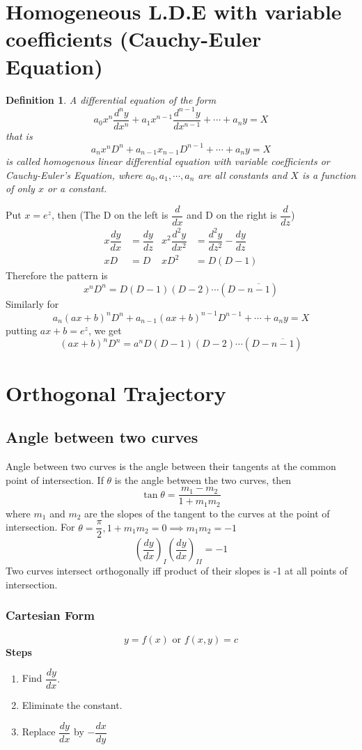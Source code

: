 \documentclass[a4paper, titlepage]{article}
\newtheorem{definition}{Definition}[section]
\begin{document}
\section{Homogeneous L.D.E with variable coefficients (Cauchy-Euler Equation) }
    \begin{definition}
        A differential equation of the form
        \[ a_0x^n\dfrac{d^ny}{dx^n} + a_1x^{n-1}\dfrac{d^{n-1}y}{dx^{n-1}} + \cdots + a_ny = X \]
        that is $$a_nx^nD^n + a_{n-1}x_{n-1}D^{n-1} + \cdots + a_ny = X$$ is called
        homogenous linear differential equation with variable coefficients
        or Cauchy-Euler's Equation, where $a_0, a_1, \cdots, a_n$ are all
        constants and $X$ is a function of only $x$ or a constant.
    \end{definition}
    Put $x = e^z$, then (The D on the left is $\dfrac{d}{dx}$ and D
    on the right is $\dfrac{d}{dz}$)
    \begin{align*}
        x\dfrac{dy}{dx} &= \dfrac{dy}{dz} &
        x^2\dfrac{d^2y}{dx^2} &= \dfrac{d^2y}{dz^2} - \dfrac{dy}{dz} \\
        xD &= D & xD^2 &= D(D-1)
    \end{align*}
    Therefore the pattern is $$x^nD^n = D(D-1)(D-2)\cdots(D-\overline{n-1})$$
    Similarly for $$a_n(ax+b)^nD^n + a_{n-1}(ax+b)^{n-1}D^{n-1} + \cdots + a_ny = X$$
    putting $ax + b = e^z$, we get $$(ax + b)^nD^n = a^nD(D-1)(D-2)\cdots(D-\overline{n-1}) $$

\section{Orthogonal Trajectory}
    \subsection{Angle between two curves}
        Angle between two curves is the angle between their tangents
        at the common point of intersection. If $\theta$ is the 
        angle between the two curves, then
        $$\tan\theta = \dfrac{m_1 - m_2}{1 + m_1m_2}$$ where $m_1$ and
        $m_2$ are the slopes of the tangent to the curves at the point of
        intersection. For $\theta = \dfrac{\pi}{2}, 1 + m_1m_2 = 0 
        \implies m_1m_2 = -1$ \[ \left(\dfrac{dy}{dx}\right)_I\left(
        \dfrac{dy}{dx}\right)_{II} = -1 \]
        Two curves intersect orthogonally iff product of their slopes
        is -1 at all points of intersection.
        \subsubsection{Cartesian Form}
        \[ y = f(x) \text{ or } f(x,y) = c \]
        \textbf{Steps}
        \begin{enumerate}[label=\textbf{\arabic*}]
            \item Find $\dfrac{dy}{dx}.$
            \item Eliminate the constant.
            \item Replace $\dfrac{dy}{dx}$ by $-\dfrac{dx}{dy}$
        \end{enumerate}
\end{document}

